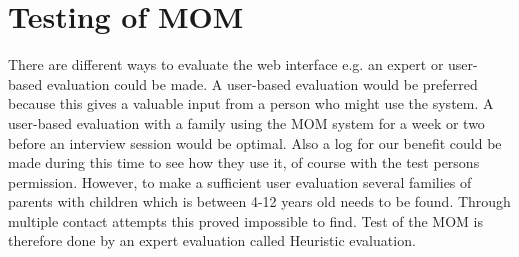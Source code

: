 \chapter{Testing of MOM}
There are different ways to evaluate the web interface e.g. an expert or user-based evaluation could be made. A user-based evaluation would be preferred because this gives a valuable input from a person who might use the system. A user-based evaluation with a family using the MOM system for a week or two before an interview session would be optimal. Also a log for our benefit could be made during this time to see how they use it, of course with the test persons permission. However, to make a sufficient user evaluation several families of parents with children which is between 4-12 years old needs to be found. Through multiple contact attempts this proved impossible to find. Test of the MOM is therefore done by an expert evaluation called Heuristic evaluation. 

